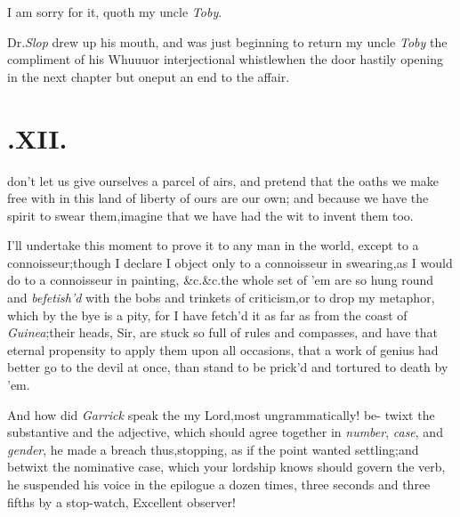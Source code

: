 \documentclass{article}
\begin{document}
I am sorry for it, quoth my uncle \textit{Toby}.

Dr.\@ \textit{Slop} drew up his mouth, and was just beginning to return my uncle \textit{Toby} the
compliment of his Whu\tsk u\tsk u\tsk or interjectional whistle\tsh when the door hastily
opening in the next chapter but one\tsh put an end to the affair.

\section{.\quad  XII.}

 don’t let us give ourselves a\break
parcel of airs, and pretend that the oaths we make free with in
this land of liberty of ours are our own; and because we have the
spirit to swear them,\break\tsh imagine that we have had the wit
to invent them too.

I’ll undertake this moment to prove it to any man in the
world, except to a connoisseur;\tsh though I declare I
object only to a connoisseur in swearing,\tsh as I would
do to a connoisseur in painting, \&c.\@ \&c.\@ the whole set of
’em are so hung round and \textit{befetish’d} with the
bobs and trinkets of criticism,\tsh or to drop my
metaphor, which by the bye is a pity,\break
\tsh for I have
fetch’d it as far as from the coast of
\textit{Guinea};\tsk their heads, Sir, are stuck so full of rules and compasses, and
have that eternal propensity to apply them upon all occasions, that
a work of genius had better go to the devil at once, than stand to
be prick’d and tortured to death by ’em.

\tsh And how did \textit{Garrick} speak the\break
{}\break
my Lord,\tsk most ungrammatically! be- twixt the substantive and the adjective, which
should agree together in \textit{number}, \textit{case}, and \textit{gender}, he
made a breach thus,\tsk stopping, as if the point wanted
settling;\break\tsh and betwixt the nominative case, which your
lordship knows should go\-vern the verb, he suspended his voice\break
in the epilogue a dozen times, three seconds and three fifths by a stop-watch,\break
{}
\tsh Excellent observer!
\end{document}
